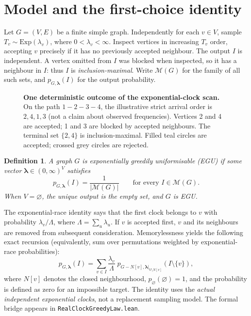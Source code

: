 \documentclass[11pt,a4paper]{article}
\newtheorem{definition}{Definition}
\newcommand{\MIS}{\mathcal M}
\newcommand{\rate}{\boldsymbol\lambda}
\begin{document}
\section{Model and the first-choice identity}
Let $G=(V,E)$ be a finite simple graph.  Independently for each $v\in V$, sample $T_v\sim\mathrm{Exp}(\lambda_v)$, where $0<\lambda_v<\infty$.  Inspect vertices in increasing $T_v$ order, accepting $v$ precisely if it has no previously accepted neighbour.  The output $I$ is independent.  A vertex omitted from $I$ was blocked when inspected, so it has a neighbour in $I$: thus $I$ is \emph{inclusion-maximal}.  Write $\MIS(G)$ for the family of all such sets, and $p_{G,\rate}(I)$ for the output probability.

\begin{figure}[htbp]\centering\figscan
\caption{\textbf{One deterministic outcome of the exponential-clock scan.}  On the path $1-2-3-4$, the illustrative strict arrival order is $2,4,1,3$ (not a claim about observed frequencies).  Vertices 2 and 4 are accepted; 1 and 3 are blocked by accepted neighbours.  The terminal set $\{2,4\}$ is inclusion-maximal.  Filled teal circles are accepted; crossed grey circles are rejected.}\label{fig:scan}\end{figure}

\begin{definition}\label{def:egu}
A graph $G$ is \emph{exponentially greedily uniformisable} (EGU) if some vector $\rate\in(0,\infty)^V$ satisfies
\[p_{G,\rate}(I)=\frac{1}{|\MIS(G)|}\qquad\text{for every }I\in\MIS(G).\]
When $V=\varnothing$, the unique output is the empty set, and $G$ is EGU.
\end{definition}

The exponential-race identity says that the first clock belongs to $v$ with probability $\lambda_v/\Lambda$, where $\Lambda=\sum_u\lambda_u$.  If $v$ is accepted first, $v$ and its neighbours are removed from subsequent consideration.  Memorylessness yields the following exact recursion (equivalently, sum over permutations weighted by exponential-race probabilities):
\begin{equation}\label{eq:race}
p_{G,\rate}(I)=\sum_{v\in I}\frac{\lambda_v}{\Lambda}\;p_{G-N[v],\rate|_{V\setminus N[v]}}(I\setminus\{v\}),
\end{equation}
where $N[v]$ denotes the closed neighbourhood, $p_{\varnothing}(\varnothing)=1$, and the probability is defined as zero for an impossible target.  The identity uses the \emph{actual independent exponential clocks}, not a replacement sampling model.  The formal bridge appears in \texttt{RealClockGreedyLaw.lean}.
\end{document}
